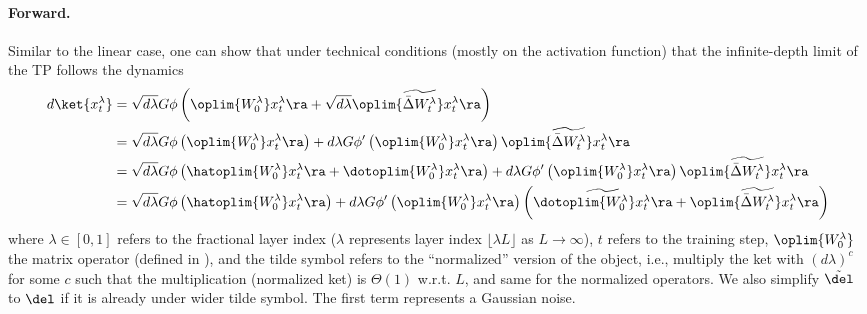 \paragraph{Forward.} Similar to the linear case, one can show that under technical conditions (mostly on the activation function) that the infinite-depth limit of the TP follows the dynamics
\begin{align*}
d\ket{x_{t}^{\lambda}} & =\sqrt{d\lambda}G\phi\left(\oplim{W_{0}^{\lambda}}x_{t}^{\lambda}\ra+\sqrt{d\lambda}\oplim{\widetilde{\bar{\Delta}W_{t}^{\lambda}}}x_{t}^{\lambda}\ra\right)\\
 & =\sqrt{d\lambda}G\phi\left(\oplim{W_{0}^{\lambda}}x_{t}^{\lambda}\ra\right)+d\lambda G\phi'\left(\oplim{W_{0}^{\lambda}}x_{t}^{\lambda}\ra\right)\oplim{\widetilde{\bar{\Delta}W_{t}^{\lambda}}}x_{t}^{\lambda}\ra\\
 & =\sqrt{d\lambda}G\phi\left(\hatoplim{W_{0}^{\lambda}}x_{t}^{\lambda}\ra+\dotoplim{W_{0}^{\lambda}}x_{t}^{\lambda}\ra\right)+d\lambda G\phi'\left(\oplim{W_{0}^{\lambda}}x_{t}^{\lambda}\ra\right)\oplim{\widetilde{\bar{\Delta}W_{t}^{\lambda}}}x_{t}^{\lambda}\ra\\
 & =\sqrt{d\lambda}G\phi\left(\hatoplim{W_{0}^{\lambda}}x_{t}^{\lambda}\ra\right)+d\lambda G\phi'\left(\oplim{W_{0}^{\lambda}}x_{t}^{\lambda}\ra\right)\left(\widetilde{\dotoplim{W_{0}^{\lambda}}x_{t}^{\lambda}\ra}+\oplim{\widetilde{\bar{\Delta}W_{t}^{\lambda}}}x_{t}^{\lambda}\ra\right)
\end{align*}
where $\lambda \in [0,1]$ refers to the fractional layer index ($\lambda$ represents layer index $\lfloor \lambda L\rfloor$ as $L\to \infty$), $t$ refers to the training step, $\oplim{W_{0}^{\lambda}}$ the matrix operator (defined in ), and the tilde symbol refers to the ``normalized'' version of the object, i.e., multiply the ket with $(d\lambda)^c$ for some $c$ such that the multiplication (normalized ket) is $\Theta(1)$ w.r.t. $L$, and same for the normalized operators. We also simplify $\tilde \del$ to $\del$ if it is already under wider tilde symbol. The first term represents a Gaussian noise.\\

